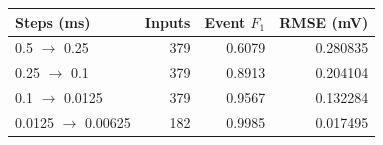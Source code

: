 \begin{tabular}{lrrr}
\toprule
Steps (ms) & Inputs & Event $F_1$ & RMSE (mV)\\
\midrule
0.5 $\to$ 0.25 & 379 & 0.6079 & 0.280835 \\
0.25 $\to$ 0.1 & 379 & 0.8913 & 0.204104 \\
0.1 $\to$ 0.0125 & 379 & 0.9567 & 0.132284 \\
0.0125 $\to$ 0.00625 & 182 & 0.9985 & 0.017495 \\
\bottomrule
\end{tabular}

